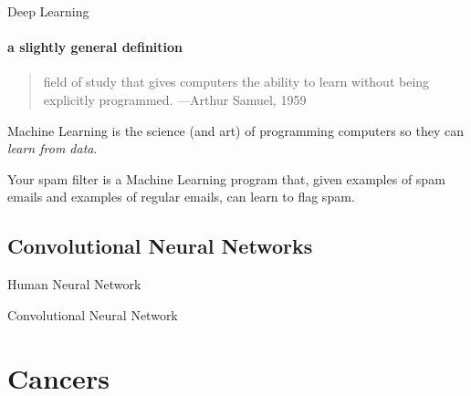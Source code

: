 \documentclass{beamer}
\begin{document}
    \begin{frame}[t]{Deep Learning}
      \framesubtitle{a slightly general definition}%
      \begin{quote}
        field of study that gives computers the ability to learn without being explicitly programmed.
        \hfill {\tiny —Arthur Samuel, 1959}
      \end{quote}
      Machine Learning is the science (and art) of programming computers so they can \textit{learn from data}. \\
      \vspace{8mm}
      \parbox{0.55\textwidth}{
      Your spam filter is a Machine Learning program that, given examples of spam emails and examples of regular emails, can learn to flag spam.
      }
    \end{frame}

    \subsection{Convolutional Neural Networks}
    \begin{frame}{Human Neural Network}
    \end{frame}
    \begin{frame}{Convolutional Neural Network}
    \end{frame}

    \section{Cancers}
\end{document}

